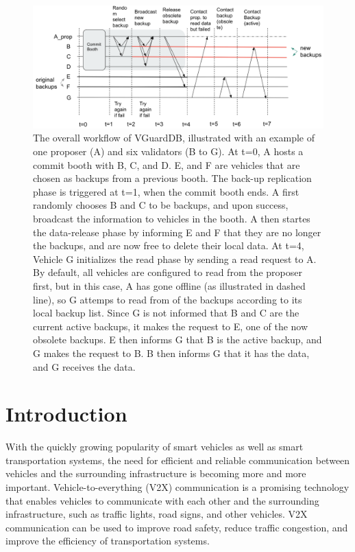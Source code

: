 \begin{figure}[t]
    \centering
    \includegraphics[width=\textwidth]{img/worflow.png}
    \caption{The overall workflow of VGuardDB, illustrated with an example of one proposer (A) and six validators (B to G). At t=0, A hosts a commit booth with B, C, and D. E, and F are vehicles that are chosen as backups from a previous booth. The back-up replication phase is triggered at t=1, when the commit booth ends. A first randomly chooses B and C to be backups, and upon success, broadcast the information to vehicles in the booth. A then startes the data-release phase by informing E and F that they are no longer the backups, and are now free to delete their local data. At t=4, Vehicle G initializes the read phase by sending a read request to A. By default, all vehicles are configured to read from the proposer first, but in this case, A has gone offline (as illustrated in dashed line), so G attemps to read from of the backups according to its local backup list. Since G is not informed that B and C are the current active backups, it makes the request to E, one of the now obsolete backups. E then informs G that B is the active backup, and G makes the request to B. B then informs G that it has the data, and G receives the data. }
    \label{fig:workflow}
\end{figure}
\section{Introduction}
With the quickly growing popularity of smart vehicles as well as smart transportation systems, the need for efficient and reliable communication between vehicles and the surrounding infrastructure is becoming more and more important. Vehicle-to-everything (V2X) communication is a promising technology that enables vehicles to communicate with each other and the surrounding infrastructure, such as traffic lights, road signs, and other vehicles. V2X communication can be used to improve road safety, reduce traffic congestion, and improve the efficiency of transportation systems. 

